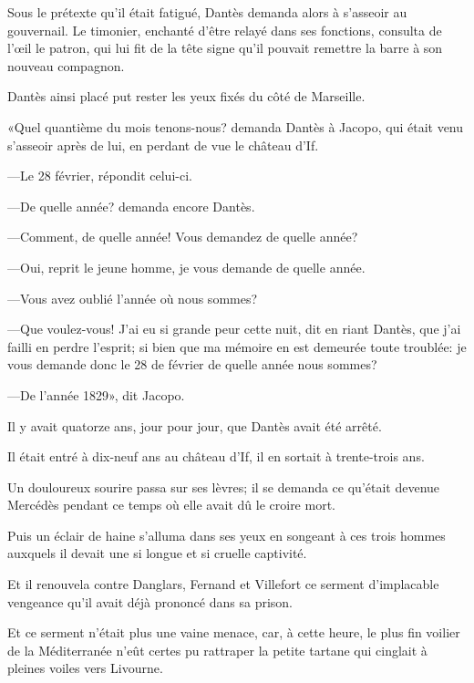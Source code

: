 Sous le prétexte qu'il était fatigué, Dantès demanda alors à s'asseoir au gouvernail. Le timonier, enchanté d'être relayé dans ses fonctions, consulta de l'œil le patron, qui lui fit de la tête signe qu'il pouvait remettre la barre à son nouveau compagnon.

Dantès ainsi placé put rester les yeux fixés du côté de Marseille.

«Quel quantième du mois tenons-nous? demanda Dantès à Jacopo, qui était venu s'asseoir après de lui, en perdant de vue le château d'If.

—Le 28 février, répondit celui-ci.

—De quelle année? demanda encore Dantès.

—Comment, de quelle année! Vous demandez de quelle année?

—Oui, reprit le jeune homme, je vous demande de quelle année.

—Vous avez oublié l'année où nous sommes?

—Que voulez-vous! J'ai eu si grande peur cette nuit, dit en riant Dantès, que j'ai failli en perdre l'esprit; si bien que ma mémoire en est demeurée toute troublée: je vous demande donc le 28 de février de quelle année nous sommes?

—De l'année 1829», dit Jacopo.

Il y avait quatorze ans, jour pour jour, que Dantès avait été arrêté.

Il était entré à dix-neuf ans au château d'If, il en sortait à trente-trois ans.

Un douloureux sourire passa sur ses lèvres; il se demanda ce qu'était devenue Mercédès pendant ce temps où elle avait dû le croire mort.

Puis un éclair de haine s'alluma dans ses yeux en songeant à ces trois hommes auxquels il devait une si longue et si cruelle captivité.

Et il renouvela contre Danglars, Fernand et Villefort ce serment d'implacable vengeance qu'il avait déjà prononcé dans sa prison.

Et ce serment n'était plus une vaine menace, car, à cette heure, le plus fin voilier de la Méditerranée n'eût certes pu rattraper la petite tartane qui cinglait à pleines voiles vers Livourne.



